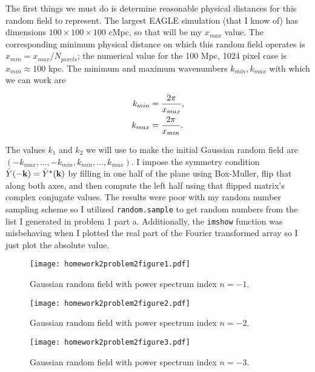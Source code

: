The first things we must do is determine reasonable physical distances for this random field to represent. The largest EAGLE simulation (that I know of) has dimensions $100 \times 100 \times 100$ cMpc, so that will be my $x_{max}$ value. The corresponding minimum physical distance on which this random field operates is $x_{min} = x_{max}/N_{pixels}$; the numerical value for the 100 Mpc, 1024 pixel case is $x_{min} \approx 100$ kpc. The minimum and maximum wavenumbers $k_{min}, k_{max}$ with which we can work are

\begin{align}
k_{min} &= {2\pi \over x_{max}}, \\
k_{max} &= {2\pi \over x_{min}}.
\end{align} 

The values $k_{1}$ and $k_{2}$ we will use to make the initial Gaussian random field are $(-k_{max}, \dots, -k_{min}, k_{min}, \dots, k_{max})$. I impose the symmetry condition $\bar{Y}(-\mathbf{k}) = \bar{Y}^{\star}(\mathbf{k})$ by filling in one half of the plane using Box-Muller, flip that along both axes, and then compute the left half using that flipped matrix's complex conjugate values. The results were poor with my random number sampling scheme so I utilized \texttt{random.sample} to get random numbers from the list I generated in problem 1 part a. Additionally, the \texttt{imshow} function was misbehaving when I plotted the real part of the Fourier transformed array so I just plot the absolute value.



\clearpage

\begin{figure}[h]
    \centering
    \texttt{[image: homework2problem2figure1.pdf]}
    \caption{Gaussian random field with power spectrum index $n=-1$.}
    \label{fig:2221}
\end{figure}

\begin{figure}[h]
    \centering
    \texttt{[image: homework2problem2figure2.pdf]}
    \caption{Gaussian random field with power spectrum index $n=-2$.}
    \label{fig:222}
\end{figure}

\begin{figure}[h]
    \centering
    \texttt{[image: homework2problem2figure3.pdf]}
    \caption{Gaussian random field with power spectrum index $n=-3$.}
    \label{fig:223}
\end{figure}

\clearpage
